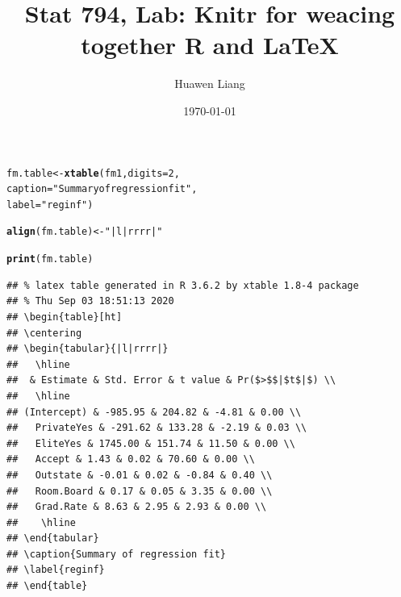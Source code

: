\documentclass{article}\usepackage[]{graphicx}\usepackage[]{color}
\title{Stat 794, Lab: Knitr for weacing together R and LaTeX}
\author{Huawen Liang}
\date{\today}
\makeatletter
\newcommand{\hlnum}[1]{\textcolor[rgb]{0.686,0.059,0.569}{#1}}%
\newcommand{\hlstr}[1]{\textcolor[rgb]{0.192,0.494,0.8}{#1}}%
\newcommand{\hlstd}[1]{\textcolor[rgb]{0.345,0.345,0.345}{#1}}%
\newcommand{\hlkwb}[1]{\textcolor[rgb]{0.69,0.353,0.396}{#1}}%
\newcommand{\hlkwc}[1]{\textcolor[rgb]{0.333,0.667,0.333}{#1}}%
\newcommand{\hlkwd}[1]{\textcolor[rgb]{0.737,0.353,0.396}{\textbf{#1}}}%
\newenvironment{kframe}{%
 \def\at@end@of@kframe{}%
 \ifinner\ifhmode%
  \def\at@end@of@kframe{\end{minipage}}%
  \begin{minipage}{\columnwidth}%
 \fi\fi%
 \def\FrameCommand##1{\hskip\@totalleftmargin \hskip-\fboxsep
 \colorbox{shadecolor}{##1}\hskip-\fboxsep
     \hskip-\linewidth \hskip-\@totalleftmargin \hskip\columnwidth}%
 \MakeFramed {\advance\hsize-\width
   \@totalleftmargin\z@ \linewidth\hsize
   \@setminipage}}%
 {\par\unskip\endMakeFramed%
 \at@end@of@kframe}
\newenvironment{knitrout}{}{} %
\makeatother
\begin{document}
 
\maketitle









\begin{knitrout}
\color{fgcolor}\begin{kframe}
\begin{alltt}
\hlstd{fm.table} \hlkwb{<-} \hlkwd{xtable}\hlstd{(fm1,} \hlkwc{digits}\hlstd{=}\hlnum{2}\hlstd{,}
                   \hlkwc{caption} \hlstd{=} \hlstr{"Summary of regression fit"}\hlstd{,}
                   \hlkwc{label}\hlstd{=}\hlstr{"reginf"}\hlstd{)}

\hlkwd{align}\hlstd{(fm.table)} \hlkwb{<-} \hlstr{"|l|rrrr|"}

\hlkwd{print}\hlstd{(fm.table)}
\end{alltt}
\begin{verbatim}
## % latex table generated in R 3.6.2 by xtable 1.8-4 package
## % Thu Sep 03 18:51:13 2020
## \begin{table}[ht]
## \centering
## \begin{tabular}{|l|rrrr|}
##   \hline
##  & Estimate & Std. Error & t value & Pr($>$$|$t$|$) \\ 
##   \hline
## (Intercept) & -985.95 & 204.82 & -4.81 & 0.00 \\ 
##   PrivateYes & -291.62 & 133.28 & -2.19 & 0.03 \\ 
##   EliteYes & 1745.00 & 151.74 & 11.50 & 0.00 \\ 
##   Accept & 1.43 & 0.02 & 70.60 & 0.00 \\ 
##   Outstate & -0.01 & 0.02 & -0.84 & 0.40 \\ 
##   Room.Board & 0.17 & 0.05 & 3.35 & 0.00 \\ 
##   Grad.Rate & 8.63 & 2.95 & 2.93 & 0.00 \\ 
##    \hline
## \end{tabular}
## \caption{Summary of regression fit} 
## \label{reginf}
## \end{table}
\end{verbatim}
\end{kframe}
\end{knitrout}
\end{document}
